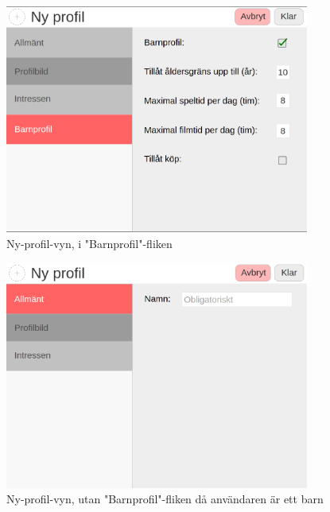 \documentclass[a4paper,12pt,titlepage]{article}
\begin{document}
\begin{figure}[h]
    \centering
    \includegraphics[width=10cm]{../screenshots/new_profile_kids.png}
    \caption{Ny-profil-vyn, i "Barnprofil"-fliken}
\end{figure}

\begin{figure}[h]
    \centering
    \includegraphics[width=10cm]{../screenshots/new_profile_no_kids.png}
    \caption{Ny-profil-vyn, utan "Barnprofil"-fliken då användaren är ett barn}
\end{figure}
\end{document}
